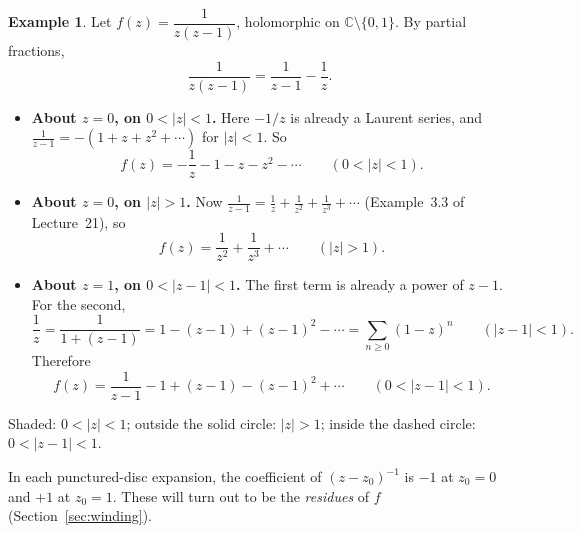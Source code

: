 \documentclass[11pt]{article}
\theoremstyle{plain}
\theoremstyle{definition}
\newtheorem{example}[theorem]{Example}
\theoremstyle{remark}
\numberwithin{equation}{section}
\newcommand{\C}{\mathbb{C}}
\newenvironment{lecturefigure}
 {\par\addvspace{0.25em}\begingroup\setlength{\parskip}{0pt}\centering}
 {\par\endgroup\addvspace{0.25em}}
\begin{document}
\begin{example}\label{ex:zz1}
Let $f(z)=\dfrac{1}{z(z-1)}$, holomorphic on $\C\setminus\{0,1\}$. By
partial fractions,
\begin{equation}
 \frac{1}{z(z-1)}=\frac{1}{z-1}-\frac1z.
\end{equation}
\begin{itemize}
 \item \textbf{About $z=0$, on $0<|z|<1$.} Here $-1/z$ is already a Laurent
 series, and $\frac{1}{z-1}=-(1+z+z^2+\cdots)$ for $|z|<1$. So
 \begin{equation}
  f(z)=-\frac1z-1-z-z^2-\cdots\qquad(0<|z|<1).
 \end{equation}
 \item \textbf{About $z=0$, on $|z|>1$.} Now
 $\frac{1}{z-1}=\frac1z+\frac1{z^2}+\frac1{z^3}+\cdots$
 (Example~3.3 of Lecture~21), so
 \begin{equation}
  f(z)=\frac1{z^2}+\frac1{z^3}+\cdots\qquad(|z|>1).
 \end{equation}
 \item \textbf{About $z=1$, on $0<|z-1|<1$.}
 The first term is already a power of $z-1$. For the second,
 \begin{equation}
  \frac1z=\frac{1}{1+(z-1)}=1-(z-1)+(z-1)^2-\cdots
  =\sum_{n\geq0}(1-z)^n\qquad(|z-1|<1).
 \end{equation}
 Therefore
 \begin{equation}
  f(z)=\frac{1}{z-1}-1+(z-1)-(z-1)^2+\cdots\qquad(0<|z-1|<1).
 \end{equation}
\end{itemize}
\begin{lecturefigure}

{\small Shaded: $0<|z|<1$; outside the solid circle: $|z|>1$;
inside the {\color{ForestGreen}dashed} circle: $0<|z-1|<1$.}
\end{lecturefigure}
In each punctured-disc expansion, the coefficient of $(z-z_0)^{-1}$ is $-1$
at $z_0=0$ and $+1$ at $z_0=1$. These will turn out to be the
\emph{residues} of $f$ (Section~\ref{sec:winding}).
\end{example}
\end{document}
